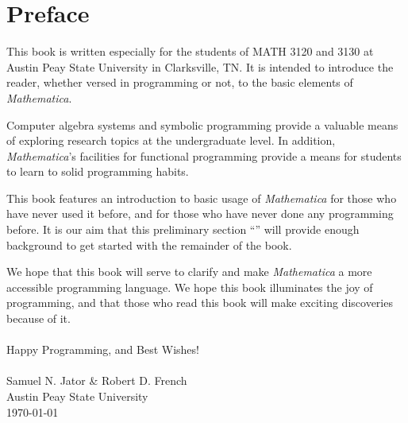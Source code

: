 \chapter*{Preface}

This book is written especially for the students of MATH 3120 and 3130 at Austin Peay State University in Clarksville, TN. It is intended to introduce the reader, whether versed in programming or not, to the basic elements of \emph{Mathematica}.

Computer algebra systems and symbolic programming provide a valuable means of exploring research topics at the undergraduate level. In addition, \emph{Mathematica}'s facilities for functional programming provide a means for students to learn to solid programming habits.

This book features an introduction to basic usage of \emph{Mathematica} for those who have never used it before, and for those who have never done any programming before. It is our aim that this preliminary section ``'' will provide enough background to get started with the remainder of the book.

We hope that this book will serve to clarify and make \emph{Mathematica} a more accessible programming language. We hope this book illuminates the joy of programming, and that those who read this book will make exciting discoveries because of it.\\
\\
Happy Programming, and Best Wishes!\\
\\
Samuel N. Jator \& Robert D. French\\
Austin Peay State University\\
\today
